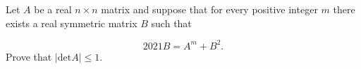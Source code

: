 Let $A$ be a real $n \times n$ matrix and suppose that for every positive integer $m$ there exists a real symmetric matrix $B$ such that

$$2021B = A^m+B^2.$$
Prove that $|\text{det} A| \leq 1$.